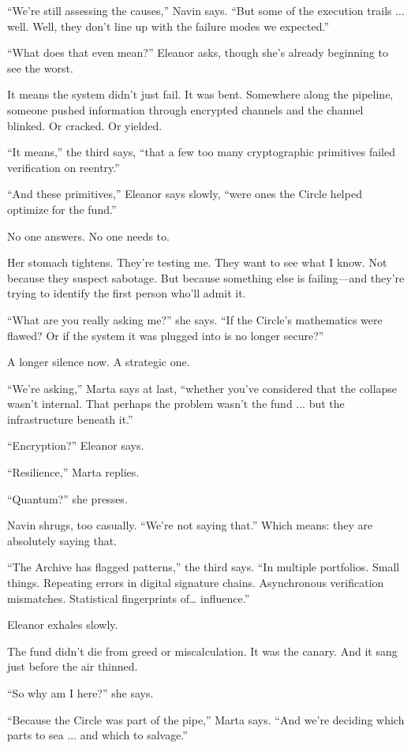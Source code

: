 “We’re still assessing the causes,” Navin says. “But some of the execution trails ... well. Well, they don’t line up with the failure modes we expected.”

“What does that even mean?” Eleanor asks, though she’s already beginning to see the worst.

It means the system didn’t just fail. It was bent. Somewhere along the pipeline, someone pushed information through encrypted channels and the channel blinked. Or cracked. Or yielded.

“It means,” the third says, “that a few too many cryptographic primitives failed verification on reentry.”

“And these primitives,” Eleanor says slowly, “were ones the Circle helped optimize for the fund.”

No one answers. No one needs to.

Her stomach tightens. They’re testing me. They want to see what I know. Not because they suspect sabotage. But because something else is failing—and they’re trying to identify the first person who’ll admit it.

“What are you really asking me?” she says. “If the Circle’s mathematics were flawed? Or if the system it was plugged into is no longer secure?”

A longer silence now. A strategic one.

“We’re asking,” Marta says at last, “whether you’ve considered that the collapse wasn’t internal. That perhaps the problem wasn’t the fund ... but the infrastructure beneath it.”

“Encryption?” Eleanor says.

“Resilience,” Marta replies.

“Quantum?” she presses.

Navin shrugs, too casually. “We’re not saying that.” Which means: they are absolutely saying that.

“The Archive has flagged patterns,” the third says. “In multiple portfolios. Small things. Repeating errors in digital signature chains. Asynchronous verification mismatches. Statistical fingerprints of… influence.”

Eleanor exhales slowly.

The fund didn’t die from greed or miscalculation. It was the canary. And it sang just before the air thinned.

“So why am I here?” she says.

“Because the Circle was part of the pipe,” Marta says. “And we’re deciding which parts to sea ... and which to salvage.”

